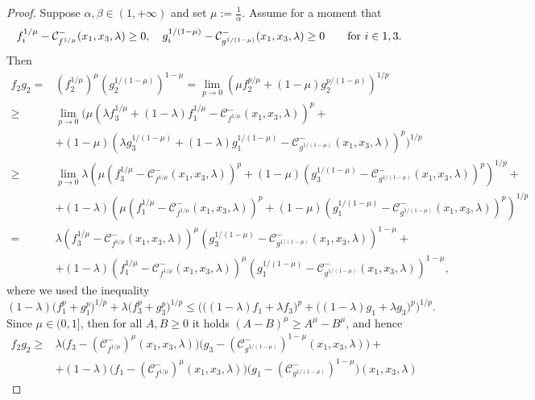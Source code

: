 \documentclass[11pt, reqno]{amsart}
\theoremstyle{definition}
\numberwithin{equation}{section}
\begin{document}
 \begin{proof}
 Suppose $\alpha,\beta\in(1,+\infty)$ and set $\mu:= \frac{1}{\alpha}$. 
 Assume for a moment that
\begin{equation}\label{eq_dim_buonpositura}
f^{1/\mu}_i-\mathcal{C}^-_{f^{1/\mu}}(x_1,x_3,\lambda)\geq 0, \quad g_i^{1/(1-\mu)}-\mathcal{C}^-_{g^{1/(1-\mu)}}(x_1,x_3,\lambda) \geq0 \qquad \hbox{for $i\in{1,3}$}.
\end{equation}
 Then
	\begin{align*}
	f_2 g_2=&\left(f_2^{1/\mu}\right)^\mu \left(g_2^{1/(1-\mu)}\right)^{1-\mu}
	= \lim_{p\to 0}\left(\mu f_2^{p/\mu} + (1-\mu)g_2^{p/(1-\mu)}\right)^{1/p}\\
	\geq& \lim_{p\to 0} \bigg(\mu \left(\lambda f_3^{1/\mu}+(1-\lambda)f_1^{1/\mu}-\mathcal{C}^-_{f^{1/\mu}}(x_1,x_3,\lambda)\right)^{p}+
	\\& + (1-\mu)\left(\lambda g_3^{1/(1-\mu)}+(1-\lambda)g_1^{1/(1-\mu)}-\mathcal{C}^-_{g^{1/(1-\mu)}}(x_1,x_3,\lambda)\right)^{p}\bigg)^{1/p}\\
	\geq& \lim_{p\to 0} \lambda \left(\mu (f_3^{1/\mu}-\mathcal{C}^-_{f^{1/\mu}}(x_1,x_3,\lambda))^p+(1-\mu)\left(g_3^{1/(1-\mu)}-\mathcal{C}^-_{g^{1/(1-\mu)}}(x_1,x_3,\lambda)\right)^p \right)^{1/p}+ \\
	 &+(1-\lambda) \left(\mu (f_1^{1/\mu}-\mathcal{C}^-_{f^{1/\mu}}(x_1,x_3,\lambda))^p+(1-\mu)\left(g_1^{1/(1-\mu)}-\mathcal{C}^-_{g^{1/(1-\mu)}}(x_1,x_3,\lambda)\right)^p\right)^{1/p}\\
	=& \lambda\left(f_3^{1/\mu}-\mathcal{C}^-_{f^{1/\mu}}(x_1,x_3,\lambda)\right)^\mu \left(g_3^{1/(1-\mu)}-\mathcal{C}^-_{g^{1/(1-\mu)}}(x_1,x_3,\lambda)\right)^{1-\mu}+
	\\&+(1-\lambda)\left(f_1^{1/\mu}-\mathcal{C}^-_{f^{1/\mu}}(x_1,x_3,\lambda)\right)^\mu \left(g_1^{1/(1-\mu)}-\mathcal{C}^-_{g^{1/(1-\mu)}}(x_1,x_3,\lambda)\right)^{1-\mu},
\end{align*}
where we used the inequality \cite[Property 7]{kennington}
\[ (1-\lambda)\big(f_1^p+g_1^p\big)^{1/p}+\lambda \big(f_3^p+g_3^p\big)^{1/p}\leq \Big(\big((1-\lambda)f_1+\lambda f_3\big)^p+\big((1-\lambda)g_1+\lambda g_3\big)^p\Big)^{1/p}. \]
		Since $\mu\in (0,1]$, then for all $A,B\geq0$ it holds $(A-B)^\mu\geq A^\mu-B^\mu$, and hence
\begin{align*}
	f_2g_2 \geq& \lambda \big(f_3-(\mathcal{C}^-_{f^{1/\mu}})^\mu(x_1,x_3,\lambda)\big)\big(g_3-(\mathcal{C}^-_{g^{1/(1-\mu)}})^{1-\mu}(x_1,x_3,\lambda)\big)+\\ &+(1-\lambda)\big(f_1-(\mathcal{C}^-_{f^{1/\mu}})^\mu(x_1,x_3,\lambda)\big)\big(g_1-(\mathcal{C}^-_{g^{1/(1-\mu)}})^{1-\mu}\big) (x_1,x_3,\lambda)

\end{align*}
\end{proof}
\end{document}
